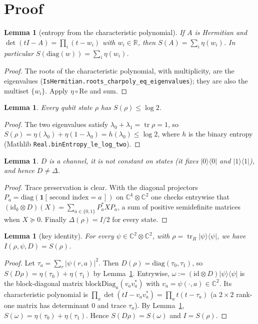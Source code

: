\documentclass[11pt]{article}
\newtheorem{lemma}[theorem]{Lemma}
\theoremstyle{definition}
\newcommand{\tr}{\operatorname{tr}}
\newcommand{\nml}{\eta}
\begin{document}
\section{Proof}

\begin{lemma}[entropy from the characteristic polynomial]\label{l:cp}
If $A$ is Hermitian and $\det(tI-A)=\prod_i(t-w_i)$ with $w_i\in\mathbb{R}$, then
$S(A)=\sum_i\nml(w_i)$. In particular $S(\mathrm{diag}(w))=\sum_i\nml(w_i)$.
\end{lemma}
\begin{proof}
The roots of the characteristic polynomial, with multiplicity, are the eigenvalues
(\texttt{IsHermitian.roots\_charpoly\_eq\_eigenvalues}); they are also the multiset $\{w_i\}$.
Apply $\nml\circ\mathrm{Re}$ and sum.
\end{proof}

\begin{lemma}\label{l:log2}
Every qubit state $\rho$ has $S(\rho)\le\log 2$.
\end{lemma}
\begin{proof}
The two eigenvalues satisfy $\lambda_0+\lambda_1=\tr\rho=1$, so
$S(\rho)=\nml(\lambda_0)+\nml(1-\lambda_0)=h(\lambda_0)\le\log 2$, where $h$ is the binary entropy
(Mathlib \texttt{Real.binEntropy\_le\_log\_two}).
\end{proof}

\begin{lemma}\label{l:ch}
$D$ is a channel, it is not constant on states (it fixes $|0\rangle\langle 0|$ and
$|1\rangle\langle 1|$), and hence $D\neq\Delta$.
\end{lemma}
\begin{proof}
Trace preservation is clear. With the diagonal projectors
$P_a=\mathrm{diag}(\mathbf{1}[\,\text{second index}=a\,])$ on $\mathbb{C}^k\otimes\mathbb{C}^2$
one checks entrywise that $(\mathrm{id}_k\otimes D)(X)=\sum_{a\in\{0,1\}}P_a^*XP_a$, a sum of
positive semidefinite matrices when $X\succeq 0$. Finally $\Delta(\rho)=I/2$ for every state.
\end{proof}

\begin{lemma}[key identity]\label{l:key}
For every $\psi\in\mathbb{C}^2\otimes\mathbb{C}^2$, with $\rho=\tr_R|\psi\rangle\langle\psi|$,
we have $I(\rho,\psi,D)=S(\rho)$.
\end{lemma}
\begin{proof}
Let $\tau_a=\sum_r|\psi(r,a)|^2$. Then $D(\rho)=\mathrm{diag}(\tau_0,\tau_1)$, so
$S(D\rho)=\nml(\tau_0)+\nml(\tau_1)$ by Lemma~\ref{l:cp}. Entrywise,
$\omega:=(\mathrm{id}\otimes D)|\psi\rangle\langle\psi|$ is the block-diagonal matrix
$\mathrm{blockDiag}_a(v_av_a^*)$ with $v_a=\psi(\cdot,a)\in\mathbb{C}^2$. Its characteristic
polynomial is $\prod_a\det(tI-v_av_a^*)=\prod_a t(t-\tau_a)$ (a $2\times2$ rank-one matrix has
determinant $0$ and trace $\tau_a$). By Lemma~\ref{l:cp}, $S(\omega)=\nml(\tau_0)+\nml(\tau_1)$.
Hence $S(D\rho)=S(\omega)$ and $I=S(\rho)$.
\end{proof}
\end{document}
